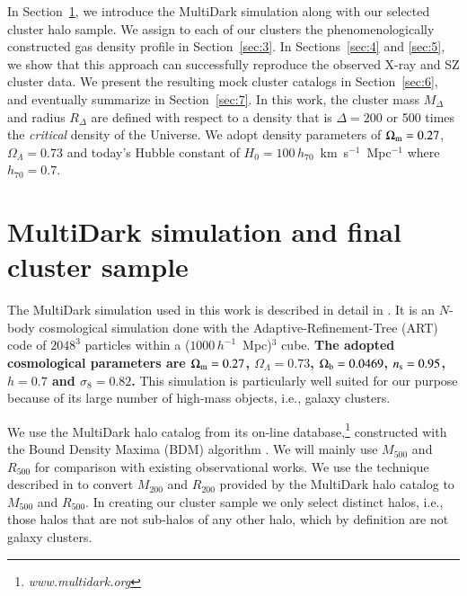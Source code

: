 \documentclass[useAMS,usenatbib]{mn2e}
\begin{document}
{    In Section~\ref{sec:2}, we introduce the MultiDark simulation along with our
    selected cluster halo sample. We assign to each of our clusters the
    phenomenologically constructed gas density profile in
    Section~\ref{sec:3}. In Sections~\ref{sec:4} and \ref{sec:5}, we show that
    this approach can successfully reproduce the observed X-ray and SZ cluster
    data. We present the resulting mock cluster catalogs in Section~\ref{sec:6},
    and eventually summarize in Section~\ref{sec:7}.  In this work, the cluster
    mass $M_{\Delta}$ and radius $R_{\Delta}$ are defined with respect to a
    density that is $\Delta=200$ or 500 times the \emph{critical} density of the
    Universe. We adopt density parameters of $\Omega_{{\mathrm{m}}}=0.27$,
    $\Omega_{\Lambda}=0.73$ and today's Hubble constant of $H_0 = 100\,
    h_{70}$~km~s$^{-1}$~Mpc$^{-1}$ where $h_{70} = 0.7$.}




\section{MultiDark simulation and final cluster sample}
\label{sec:2}
The MultiDark simulation used in this work is described in detail in
\cite{2011arXiv1104.5130P}.  It is an $N$-body cosmological simulation done with
the Adaptive-Refinement-Tree (ART) code \citep{1997ApJS..111...73K} of $2048^3$
particles within a ($1000\,h^{-1}$~Mpc)$^3$ cube. {\bf The adopted cosmological
  parameters are $\Omega_{{\mathrm{m}}}=0.27$, $\Omega_{\Lambda}=0.73$,
  $\Omega_{\mathrm{b}}=0.0469$, $n_{\mathrm{s}}=0.95$, $h=0.7$ and $\sigma_8=0.82$.} This
simulation is particularly well suited for our purpose because of its large
number of high-mass objects, i.e., galaxy clusters.
 
We use the MultiDark halo catalog from its on-line database,\footnote{\textit{www.multidark.org}} 
constructed with the Bound Density Maxima (BDM) algorithm \citep{1997astro.ph.12217K}.  
We will mainly use $M_{500}$ and $R_{500}$ for comparison with existing observational works.  
We use the technique described in \cite{2003ApJ...584..702H} to convert $M_{200}$ and
$R_{200}$ provided by the MultiDark halo catalog to $M_{500}$ and $R_{500}$.  In
creating our cluster sample we only select distinct halos, i.e., those halos that
are not sub-halos of any other halo, which by definition are not galaxy clusters.
\end{document}
